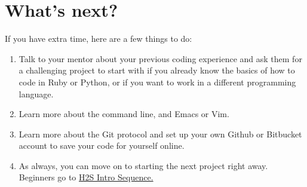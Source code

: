 \documentclass{42-en}
\begin{document}









\chapter{What's next?}

If you have extra time, here are a few things to do:

\begin{enumerate}
	\item Talk to your mentor about your previous coding experience and ask them for a challenging project to start with if you already know the basics of how to code in Ruby or Python, or if you want to work in a different programming language.

	\item Learn more about the command line, and Emacs or Vim.

	\item Learn more about the Git protocol and set up your own Github or Bitbucket account to save your code for yourself online.

	\item As always, you can move on to starting the next project right away. Beginners go to \href{https://projects.intra.42.fr/projects/h2s-intro-sequence}{H2S Intro Sequence.}

\end{enumerate}
\end{document}
